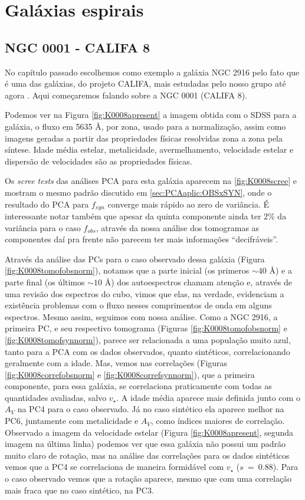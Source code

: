 \section{Galáxias espirais}
\label{sec:result:spirals}

\subsection{NGC 0001 - CALIFA 8}

No capítulo passado escolhemos como exemplo a galáxia NGC 2916 pelo fato que é uma das galáxias, do projeto CALIFA, mais
estudadas pelo nosso grupo até agora \citep{CidFernandes2013, CidFernandes2014}. Aqui começaremos falando sobre a NGC
0001 (CALIFA 8). 

Podemos ver na Figura \ref{fig:K0008apresent} a imagem obtida com o SDSS para a galáxia, o fluxo em 5635 \AA, por zona,
usado para a normalização, assim como imagens geradas a partir das propriedades físicas resolvidas zona a zona pela
síntese. Idade média estelar, metalicidade, avermelhamento, velocidade estelar e dispersão de velocidades são
as propriedades físicas. 

Os {\em scree tests} das análises PCA para esta galáxia aparecem na \ref{fig:K0008scree} e mostram o mesmo padrão
discutido em \ref{sec:PCAaplic:OBSxSYN}, onde o resultado do PCA para $f_{syn}$ converge mais rápido ao zero de
variância. É interessante notar também que apesar da quinta componente ainda ter 2\% da variância para o caso $f_{obs}$,
através da nossa análise dos tomogramas as componentes daí pra frente não parecem ter mais informações ``decifráveis''.

Através da análise das PCs para o caso observado dessa galáxia (Figura \ref{fig:K0008tomofobsnorm}), notamos que a parte
inicial (os primeros $\sim40$ \AA) e a parte final (os últimos $\sim10$ \AA) dos autoespectros chamam atenção e, através
de uma revisão dos espectros do cubo, vimos que elas, na verdade, evidenciam a existência problemas com o fluxo nesses
comprimentos de onda em alguns espectros. Mesmo assim, seguimos com nossa análise. Como a NGC 2916, a primeira PC, e seu
respectivo tomograma (Figuras \ref{fig:K0008tomofobsnorm} e \ref{fig:K0008tomofsynnorm}), parece ser relacionada a uma
população muito azul, tanto para a PCA com os dados observados, quanto sintéticos, correlacionando geralmente com a
idade. Mas, vemos nas correlações (Figuras \ref{fig:K0008correfobsnorm} e \ref{fig:K0008correfsynnorm}), que a primeira
componente, para essa galáxia, se correlaciona praticamente com todas as quantidades avaliadas, salvo $v_\star$. A idade
média aparece mais definida junto com o $A_V$ na PC4 para o caso observado. Já no caso sintético ela aparece melhor na
PC6, juntamente com metalicidade e $A_V$, como índices maiores de correlação. Observado a imagem da velocidade estelar
(Figura \ref{fig:K0008apresent}, segunda imagem na última linha) podemos ver que essa galáxia não possui um padrão muito
claro de rotação, mas na análise das correlações para os dados sintéticos vemos que a PC4 se correlaciona de maneira
formidável com $v_\star$ ($s\ =\ 0.88$). Para o caso observado vemos que a rotação aparece, mesmo que com uma correlação
mais fraca que no caso sintético, na PC3.

